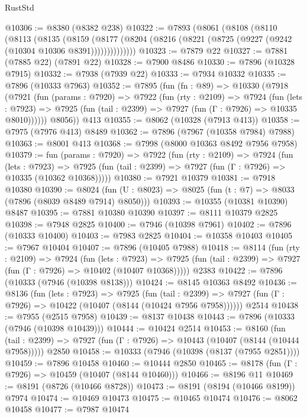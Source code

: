 \begin{lexlean}{RustStd}
\begin{coremodule}
@10306 := @8380 (@8382 @238)
@10322 := @7893
    (@8061
      (@8108
        (@8110
          (@8113
            (@8135
              (@8159
                (@8177 (@8204 (@8216 (@8221 (@8725 (@9227 (@9242 (@10304 @10306 @8391))))))))))))))
@10323 := @7879 @22
@10327 := @7881 (@7885 @22) (@7891 @22)
@10328 := @7900 @8486
@10330 := @7896 (@10328 @7915)
@10332 := @7938 (@7939 @22)
@10333 := @7934 @10332
@10335 := @7896 (@10333 @7963)
@10352 := @7895
    (fun (fn : @89) =>
    @10330
      (@7918
        (@7921
          (fun (params : @7920) =>
          @7922
            (fun (rty : @2109) =>
            @7924
              (fun (lets : @7923) =>
              @7925 (fun (tail : @2399) => @7927 (fun (Γ : @7926) => @10335 @8010))))))
        @8056))
    @413
@10355 := @8062 (@10328 (@7913 @413))
@10358 := @7975 (@7976 @413) @8489
@10362 := @7896 (@7967 (@10358 @7984) @7988)
@10363 := @8001 @413
@10368 := @7998 (@8000 @10363 @8492 @7956 @7958)
@10379 := fun (params : @7920) =>
  @7922
    (fun (rty : @2109) =>
    @7924
      (fun (lets : @7923) =>
      @7925 (fun (tail : @2399) => @7927 (fun (Γ : @7926) => @10335 (@10362 @10368)))))
@10380 := @7921 @10379
@10381 := @7918 @10380
@10390 := @8024 (fun (U : @8023) => @8025 (fun (t : @7) => @8033 (@7896 (@8039 @8489 @7914) @8050)))
@10393 := @10355 (@10381 @10390) @8487
@10395 := @7881 @10380 @10390
@10397 := @8111 @10379 @2825
@10398 := @7948 @2825
@10400 := @7946 (@10398 @7961)
@10402 := @7896 (@10333 @10400)
@10403 := @7983 @2825
@10404 := @10358 @10403
@10405 := @7967 @10404
@10407 := @7896 (@10405 @7988)
@10418 := @8114
    (fun (rty : @2109) =>
    @7924
      (fun (lets : @7923) =>
      @7925 (fun (tail : @2399) => @7927 (fun (Γ : @7926) => @10402 (@10407 @10368)))))
    @2383
@10422 := @7896 (@10333 (@7946 (@10398 @8138)))
@10424 := @8145 @10363 @8492
@10436 := @8136
    (fun (lets : @7923) =>
    @7925
      (fun (tail : @2399) =>
      @7927 (fun (Γ : @7926) => @10422 (@10407 (@8144 (@10424 @7956 @7958))))))
    @2514
@10438 := @7955 (@2515 @7958)
@10439 := @8137 @10438
@10443 := @7896 (@10333 (@7946 (@10398 @10439)))
@10444 := @10424 @2514
@10453 := @8160
    (fun (tail : @2399) => @7927 (fun (Γ : @7926) => @10443 (@10407 (@8144 (@10444 @7958)))))
    @2850
@10458 := @10333 (@7946 (@10398 (@8137 (@7955 @2851))))
@10459 := @7896 @10458
@10460 := @10444 @2850
@10465 := @8178 (fun (Γ : @7926) => @10459 (@10407 (@8144 @10460)))
@10466 := @8196 @11
@10469 := @8191 (@8726 (@10466 @8728))
@10473 := @8191 (@8194 (@10466 @8199)) @7974
@10474 := @10469 @10473
@10475 := @10465 @10474
@10476 := @8062 @10458
@10477 := @7987 @10474

\end{coremodule}
\end{lexlean}

